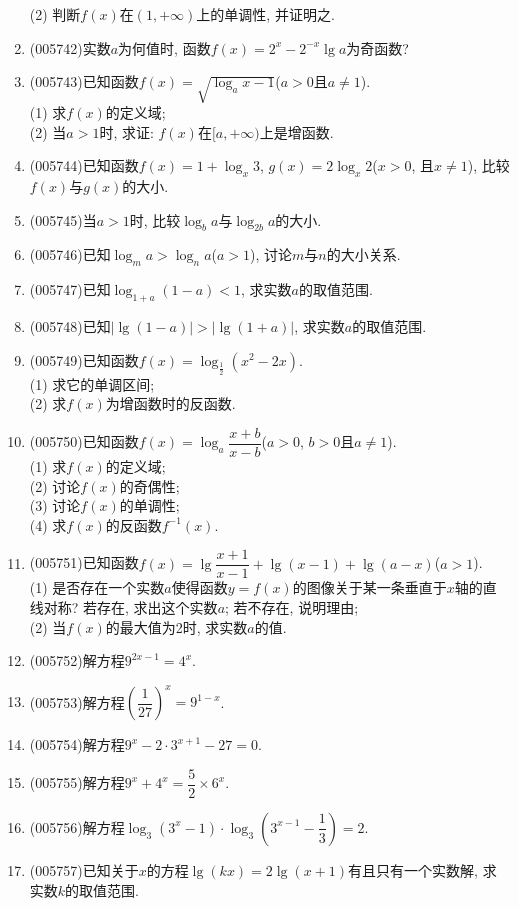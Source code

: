 \documentclass[10pt,a4paper]{article}
\begin{document}
\begin{enumerate}[1.]
(2) 判断$f(x)$在$(1,+\infty)$上的单调性, 并证明之.
\item {\tiny (005742)}实数$a$为何值时, 函数$f(x)=2^x-2^{-x}\lg a$为奇函数?
\item {\tiny (005743)}已知函数$f(x)=\sqrt {\log_ax-1}$($a>0$且$a\ne 1$).\\
(1) 求$f(x)$的定义域;\\
(2) 当$a>1$时, 求证: $f(x)$在$[a,+\infty)$上是增函数.
\item {\tiny (005744)}已知函数$f(x)=1+\log_x3$, $g(x)=2\log_x2$($x>0$, 且$x\ne 1$), 比较$f(x)$与$g(x)$的大小.
\item {\tiny (005745)}当$a>1$时, 比较$\log_ba$与$\log_{2b}a$的大小.
\item {\tiny (005746)}已知$\log_ma>\log_na$($a>1$), 讨论$m$与$n$的大小关系.
\item {\tiny (005747)}已知$\log_{1+a}(1-a)<1$, 求实数$a$的取值范围.
\item {\tiny (005748)}已知$|\lg (1-a)|>|\lg (1+a)|$, 求实数$a$的取值范围.
\item {\tiny (005749)}已知函数$f(x)=\log_{\frac 12}(x^2-2x)$.\\
(1) 求它的单调区间;\\
(2) 求$f(x)$为增函数时的反函数.
\item {\tiny (005750)}已知函数$f(x)=\log_a\dfrac{x+b}{x-b}$($a>0$, $b>0$且$a\ne 1$).\\
(1) 求$f(x)$的定义域;\\
(2) 讨论$f(x)$的奇偶性;\\
(3) 讨论$f(x)$的单调性;\\
(4) 求$f(x)$的反函数$f^{-1}(x)$.
\item {\tiny (005751)}已知函数$f(x)=\lg \dfrac{x+1}{x-1}+\lg (x-1)+\lg (a-x)$($a>1$).\\
(1) 是否存在一个实数$a$使得函数$y=f(x)$的图像关于某一条垂直于$x$轴的直线对称? 若存在, 求出这个实数$a$; 若不存在, 说明理由;\\
(2) 当$f(x)$的最大值为2时, 求实数$a$的值.
\item {\tiny (005752)}解方程$9^{2x-1}=4^x$.
\item {\tiny (005753)}解方程$(\dfrac 1{27})^x=9^{1-x}$.
\item {\tiny (005754)}解方程$9^x-2\cdot 3^{x+1}-27=0$.
\item {\tiny (005755)}解方程$9^x+4^x=\dfrac 52\times 6^x$.
\item {\tiny (005756)}解方程$\log_3(3^x-1)\cdot \log_3(3^{x-1}-\dfrac 13)=2$.
\item {\tiny (005757)}已知关于$x$的方程$\lg (kx)=2\lg (x+1)$有且只有一个实数解, 求实数$k$的取值范围.

\end{enumerate}
\end{document}
